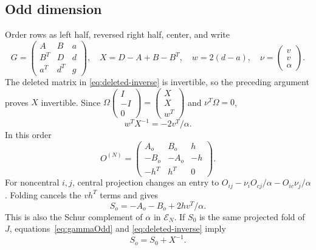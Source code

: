 \documentclass[11pt,a4paper]{amsart}
\theoremstyle{remark}\newtheorem{remark}[theorem]{Remark}
\numberwithin{equation}{section}
\newcommand{\B}{\mathsf B}
\newcommand{\EE}{\mathcal E}
\begin{document}
\subsection{Odd dimension}
Order rows as left half, reversed right half, center, and write
\[
 G=\begin{pmatrix}A&B&a\\B^T&D&d\\a^T&d^T&g\end{pmatrix},\quad
 X=D-A+B-B^T,\quad w=2(d-a),\quad \nu=\begin{pmatrix}v\\v\\\alpha\end{pmatrix}.
\]
The deleted matrix in \eqref{eq:deleted-inverse} is invertible, so the preceding argument proves $X$ invertible. Since
$\Omega\begin{pmatrix}I\\-I\\0\end{pmatrix}=\begin{pmatrix}X\\X\\w^T\end{pmatrix}$ and $\nu^T\Omega=0$,
\begin{equation}\label{eq:wXi}w^TX^{-1}=-2v^T/\alpha.\end{equation}
In this order
\[
 O^{(N)}=\begin{pmatrix}A_o&B_o&h\\-B_o&-A_o&-h\\-h^T&h^T&0\end{pmatrix}.
\]
For noncentral $i,j$, central projection changes an entry to
$O_{ij}-\nu_iO_{cj}/\alpha-O_{ic}\nu_j/\alpha$. Folding cancels the $vh^T$ terms and gives
\begin{equation}\label{eq:So}
 S_o=-A_o-B_o+2hv^T/\alpha.
\end{equation}
This is also the Schur complement of $\alpha$ in $\EE_N$. If $S_0$ is the same projected fold of $J$, equations~\eqref{eq:gammaOdd} and \eqref{eq:deleted-inverse} imply
\begin{equation}\label{eq:So-fold}S_o=S_0+X^{-1}.\end{equation}
\end{document}
